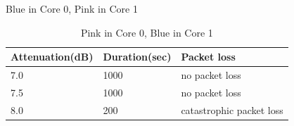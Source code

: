 \documentclass{article}
\begin{document}
{\begin{table}[ht]
\begin{minipage}{.5\textwidth}
\caption{Blue in Core 0, Pink in Core 1}
\label{table:pinkcore1}
\end{minipage}
\begin{minipage}{.5\textwidth}
\begin{center}
\begin{tabular}{|p{2.5cm}|p{2.5cm}|p{2.5cm}|}
	\hline
	 Attenuation(dB) & Duration(sec) & Packet loss \\ \hline
	 7.0  & 1000 & no packet loss \\ \hline
	 7.5 & 1000 & no packet loss \\ \hline
	 8.0  &  200 & catastrophic packet loss \\ \hline
\end{tabular}
\end{center}
\caption{Pink in Core 0, Blue in Core 1}
\label{table:pinkcore0}
\end{minipage}
\end{table}
}
\end{document}

